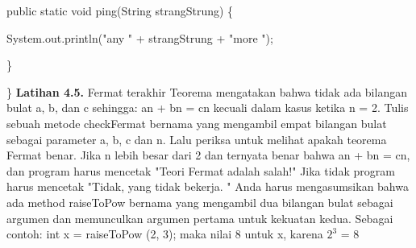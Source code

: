 public static void ping(String strangStrung) \{
	\par
	System.out.println("any " + strangStrung + "more ");
	\par
\}
\par
\}
\newline
\newline
\textbf{Latihan 4.5.} Fermat terakhir Teorema mengatakan bahwa tidak ada bilangan bulat a, b, dan c sehingga:
\newline
an + bn = cn
\newline
\newline
kecuali dalam kasus ketika n = 2.
\newline
\newline
Tulis sebuah metode checkFermat bernama yang mengambil empat bilangan bulat sebagai parameter a, b, c dan n. Lalu periksa untuk melihat apakah teorema Fermat benar. Jika n lebih besar dari 2 dan ternyata benar bahwa an + bn = cn, dan program harus mencetak "Teori Fermat adalah salah!" Jika tidak program harus mencetak "Tidak, yang tidak bekerja. "
\newline
Anda harus mengasumsikan bahwa ada method raiseToPow bernama yang mengambil dua bilangan bulat sebagai argumen dan memunculkan argumen pertama untuk kekuatan kedua. Sebagai contoh:
\newline
\newline
int x = raiseToPow (2, 3);
\newline
\newline
maka nilai 8 untuk x, karena $2^3$ = 8
